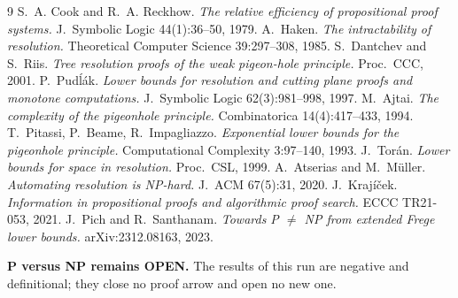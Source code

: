 \documentclass[11pt]{article}
\theoremstyle{definition}
\begin{document}
\begin{thebibliography}{9}
 S.~A. Cook and R.~A. Reckhow.
\emph{The relative efficiency of propositional proof systems.}
J.\ Symbolic Logic 44(1):36--50, 1979.
 A.~Haken. \emph{The intractability of resolution.}
Theoretical Computer Science 39:297--308, 1985.
 S.~Dantchev and S.~Riis.
\emph{Tree resolution proofs of the weak pigeon-hole principle.}
Proc.\ CCC, 2001.
 P.~Pud\'l\'ak. \emph{Lower bounds for resolution and
cutting plane proofs and monotone computations.}
J.\ Symbolic Logic 62(3):981--998, 1997.
 M.~Ajtai. \emph{The complexity of the pigeonhole principle.}
Combinatorica 14(4):417--433, 1994.
 T.~Pitassi, P.~Beame, R.~Impagliazzo.
\emph{Exponential lower bounds for the pigeonhole principle.}
Computational Complexity 3:97--140, 1993.
 J.~Tor\'an. \emph{Lower bounds for space in resolution.}
Proc.\ CSL, 1999.
 A.~Atserias and M.~M\"uller.
\emph{Automating resolution is NP-hard.} J.\ ACM 67(5):31, 2020.
 J.~Kraj\'i\v{c}ek. \emph{Information in propositional
proofs and algorithmic proof search.} ECCC TR21-053, 2021.
 J.~Pich and R.~Santhanam.
\emph{Towards P $\neq$ NP from extended Frege lower bounds.}
arXiv:2312.08163, 2023.
\end{thebibliography}

\medskip
\noindent\textbf{P versus NP remains OPEN.} The results of this run are
negative and definitional; they close no proof arrow and open no new one.

\end{document}
